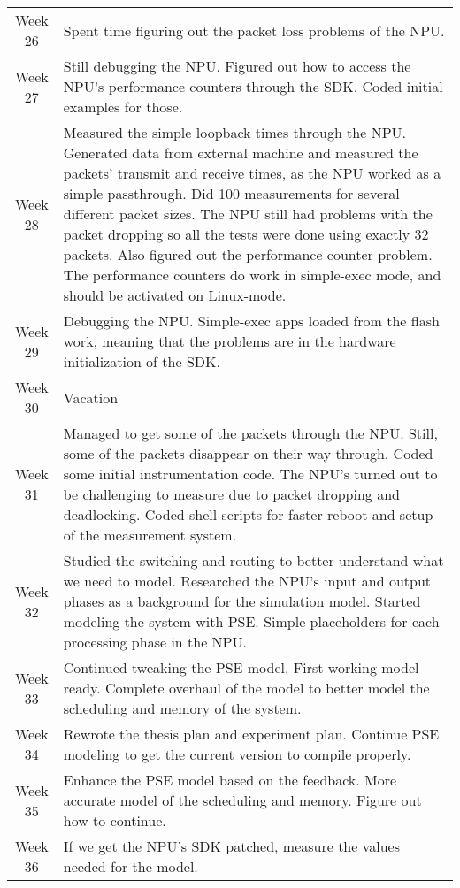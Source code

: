 \begin{table}[h]
  \centering
  \begin{tabular}{@{}c|p{10cm}@{}}
    \toprule
    Week 26 & Spent time figuring out the packet loss problems of the NPU. \\
    Week 27 & Still debugging the NPU. Figured out how to access the NPU's performance counters through the SDK. Coded initial examples for those. \\
    Week 28 & Measured the simple loopback times through the NPU. Generated data from external machine and measured the packets' transmit and receive times, as the NPU worked as a simple passthrough. Did 100 measurements for several different packet sizes. The NPU still had problems with the packet dropping so all the tests were done using exactly 32 packets. Also figured out the performance counter problem. The performance counters do work in simple-exec mode, and should be activated on Linux-mode.  \\
    Week 29 & Debugging the NPU. Simple-exec apps loaded from the flash work, meaning that the problems are in the hardware initialization of the SDK. \\
    Week 30 & Vacation \\
    Week 31 & Managed to get some of the packets through the NPU. Still, some of the packets disappear on their way through. Coded some initial instrumentation code. The NPU's turned out to be challenging to measure due to packet dropping and deadlocking. Coded shell scripts for faster reboot and setup of the measurement system. \\
    Week 32 & Studied the switching and routing to better understand what we need to model. Researched the NPU's input and output phases as a background for the simulation model. Started modeling the system with PSE. Simple placeholders for each processing phase in the NPU. \\
    Week 33 & Continued tweaking the PSE model. First working model ready. Complete overhaul of the model to better model the scheduling and memory of the system. \\
    \toprule
    Week 34 & Rewrote the thesis plan and experiment plan. Continue PSE modeling to get the current version to compile properly. \\
    Week 35 & Enhance the PSE model based on the feedback. More accurate model of the scheduling and memory. Figure out how to continue. \\
    Week 36 & If we get the NPU's SDK patched, measure the values needed for the model. \\
    \bottomrule
  \end{tabular}
\end{table}

